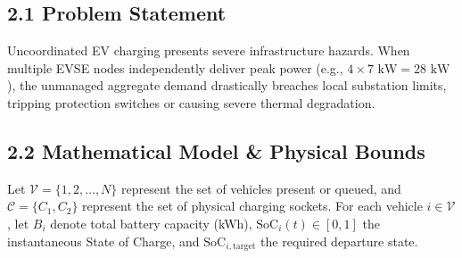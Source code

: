 \documentclass[
]{article}
\begin{document}
\subsection{2.1 Problem Statement}\label{problem-statement}

Uncoordinated EV charging presents severe infrastructure hazards. When
multiple EVSE nodes independently deliver peak power (e.g.,
\(4 \times 7\text{ kW} = 28\text{ kW}\)), the unmanaged aggregate demand
drastically breaches local substation limits, tripping protection
switches or causing severe thermal degradation.

\subsection{2.2 Mathematical Model \& Physical
Bounds}\label{mathematical-model-physical-bounds}

Let \(\mathcal{V} = \{1, 2, \dots, N\}\) represent the set of vehicles
present or queued, and \(\mathcal{C} = \{C_1, C_2\}\) represent the set
of physical charging sockets. For each vehicle \(i \in \mathcal{V}\),
let \(B_i\) denote total battery capacity (kWh),
\(\text{SoC}_i(t) \in [0, 1]\) the instantaneous State of Charge, and
\(\text{SoC}_{i,\text{target}}\) the required departure state.
\end{document}
